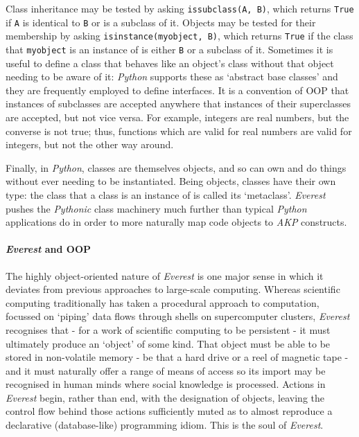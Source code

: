 \documentclass[a4paper,11pt,oneside]{book}
\begin{document}
Class inheritance may be tested by asking \texttt{issubclass(A, B)}, which returns \texttt{True} if \texttt{A} is identical to \texttt{B} or is a subclass of it. Objects may be tested for their membership by asking \texttt{isinstance(myobject, B)}, which returns \texttt{True} if the class that \texttt{myobject} is an instance of is either \texttt{B} or a subclass of it. Sometimes it is useful to define a class that behaves like an object's class without that object needing to be aware of it: \textit{Python} supports these as `abstract base classes' and they are frequently employed to define interfaces. It is a convention of OOP that instances of subclasses are accepted anywhere that instances of their superclasses are accepted, but not vice versa. For example, integers are real numbers, but the converse is not true; thus, functions which are valid for real numbers are valid for integers, but not the other way around.

Finally, in \textit{Python}, classes are themselves objects, and so can own and do things without ever needing to be instantiated. Being objects, classes have their own type: the class that a class is an instance of is called its `metaclass'. \textit{Everest} pushes the \textit{Pythonic} class machinery much further than typical \textit{Python} applications do in order to more naturally map code objects to \textit{AKP} constructs.

\paragraph{\textit{Everest} and OOP}

The highly object-oriented nature of \textit{Everest} is one major sense in which it deviates from previous approaches to large-scale computing. Whereas scientific computing traditionally has taken a procedural approach to computation, focussed on `piping' data flows through shells on supercomputer clusters, \textit{Everest} recognises that - for a work of scientific computing to be persistent - it must ultimately produce an `object' of some kind. That object must be able to be stored in non-volatile memory - be that a hard drive or a reel of magnetic tape - and it must naturally offer a range of means of access so its import may be recognised in human minds where social knowledge is processed. Actions in \textit{Everest} begin, rather than end, with the designation of objects, leaving the control flow behind those actions sufficiently muted as to almost reproduce a declarative (database-like) programming idiom. This is the soul of \textit{Everest}.
\end{document}
